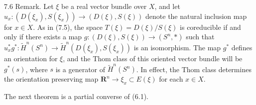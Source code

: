 7.6 Remark. Let $\xi$ be a real vector bundle over $X$, and let $u_x: (D(\xi_x), S(\xi_x)) \rightarrow (D(\xi), S(\xi))$ denote the natural inclusion map for $x \in X$. As in (7.5), the space $T(\xi) = D(\xi)/S(\xi)$ is coreducible if and only if there exists a map $g: (D(\xi), S(\xi)) \rightarrow (S^n, *)$ such that $u_x^*g^*: \tilde{H}^n(S^n) \rightarrow \tilde{H}^n(D(\xi_x), S(\xi_x))$ is an isomorphism. The map $g^*$ defines an orientation for $\xi$, and the Thom class of this oriented vector bundle will be $g^*(s)$, where $s$ is a generator of $\tilde{H}^n(S^n)$. In effect, the Thom class determines the orientation preserving map $\mathbf{R}^n \rightarrow \xi_x \subset E(\xi)$ for each $x \in X$.

The next theorem is a partial converse of (6.1).
